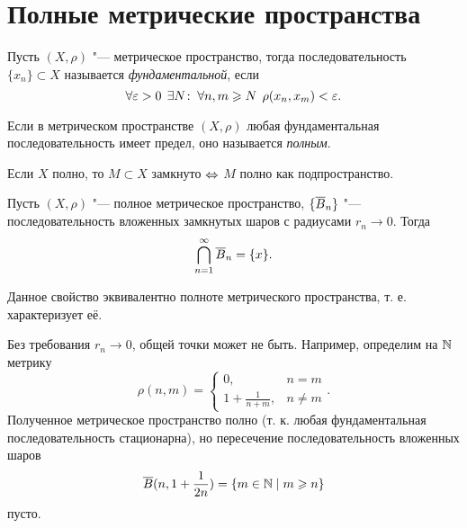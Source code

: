 \documentclass[main]{subfiles}
\begin{document}
\section{Полные метрические пространства}

\begin{definition}
  Пусть \( (X, \rho) \) "--- метрическое пространство,
  тогда последовательность \( \{ x_n \} \subset X \)
  называется \emph{фундаментальной},
  если
  \[
    \forall {\varepsilon> 0} \; \, \exists N \colon \: \forall {n, m \geqslant N} \; \,
    \rho(x_n, x_m) < \varepsilon.
  \]
\end{definition}

\begin{definition}
  Если в метрическом пространстве \( (X, \rho) \)
  любая фундаментальная последовательность имеет предел,
  оно называется \emph{полным}.
\end{definition}

\begin{exercise}
  Если \( X \) полно, то \( M \subset X \)
  замкнуто \( \Leftrightarrow \) \( M \) полно как подпространство.
\end{exercise}

\begin{theorem}\label{thm:complete-balls}
  Пусть \( (X, \rho) \) "--- полное метрическое пространство,
  \( \{ \overline{B}_n \} \) "---
  последовательность вложенных замкнутых шаров с радиусами
  \( r_n \to 0 \). Тогда
  \[
    \bigcap_{n = 1}^\infty \overline{B}_n = \{ x \}.
  \]
\end{theorem}
\begin{remark}
  Данное свойство эквивалентно полноте метрического пространства,
  т. е. характеризует её.
\end{remark}
\begin{remark}
  Без требования \( r_n \to 0 \), общей точки может не быть.
  Например, определим на \( \mathbb{N} \)
  метрику
  \[
    \rho(n, m) = \begin{cases}
      0, & n = m \\
      1 + \frac{1}{n + m}, & n \ne m
    \end{cases}.
  \]
  Полученное метрическое пространство полно
  (т. к. любая фундаментальная последовательность стационарна),
  но пересечение последовательность вложенных шаров
  \[
    \overline{B}(n, 1 + \frac{1}{2n}) = \{ m \in \mathbb{N} \mid m \geqslant n \}
  \]
  пусто.
\end{remark}
\end{document}
